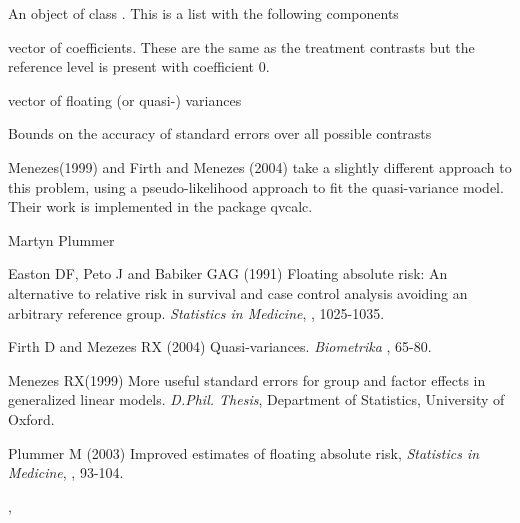 \begin{Value}
An object of class . This is a list with the following
components
\begin{ldescription}
\item[\code{coef}] vector of coefficients. These are the same as the
treatment contrasts but the reference level is present with
coefficient 0.
\item[\code{var}] vector of floating (or quasi-) variances
\item[\code{limits}] Bounds on the accuracy of standard errors over all
possible contrasts
\end{ldescription}
\end{Value}
\begin{Note}\relax
Menezes(1999) and Firth and Menezes (2004) take a slightly different
approach to this problem, using a pseudo-likelihood approach to fit
the quasi-variance model. Their work is implemented in the package qvcalc.
\end{Note}
\begin{Author}\relax
Martyn Plummer
\end{Author}
\begin{References}\relax
Easton DF, Peto J and Babiker GAG (1991) Floating absolute risk: An
alternative to relative risk in survival and case control analysis
avoiding an arbitrary reference group. \emph{Statistics in Medicine},
, 1025-1035.

Firth D and Mezezes RX (2004)  Quasi-variances.
\emph{Biometrika} , 65-80.

Menezes RX(1999)  More useful standard errors for group and factor
effects in generalized linear models.  \emph{D.Phil. Thesis},
Department of Statistics, University of Oxford.

Plummer M (2003) Improved estimates of floating absolute risk,
\emph{Statistics in Medicine}, , 93-104.
\end{References}
\begin{SeeAlso}\relax
{}, 
\end{SeeAlso}

